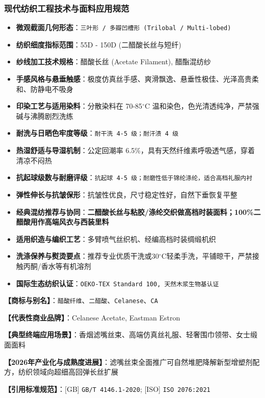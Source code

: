 \documentclass[11pt,openright,twoside,UTF8]{ctexbook}
\begin{document}
\subsubsection*{现代纺织工程技术与面料应用规范}
\begin{itemize} \setlength{\itemsep}{2pt}
    \item \textbf{微观截面几何形态}：\texttt{三叶形 / 多瓣凹槽形 (Trilobal / Multi-lobed)}
    \item \textbf{纺织细度指标范围}：55D - 150D (二醋酸长丝与短纤)
    \item \textbf{纱线加工技术规格}：醋酸长丝 (Acetate Filament), 醋酯混纺纱
    \item \textbf{手感风格与悬垂触感}：极度仿真丝手感、爽滑飘逸、悬垂性极佳、光泽高贵柔和、防静电不吸身
    \item \textbf{印染工艺与适用染料}：分散染料在 70-85$^\circ\mathrm{C}$ 温和染色，色光清透纯净，严禁强碱与沸腾剧烈洗练
    \item \textbf{耐洗与日晒色牢度等级}：\texttt{耐干洗 4-5 级；耐汗渍 4 级}
    \item \textbf{热湿舒适与导湿机制}：公定回潮率 6.5\%，具有天然纤维素呼吸透气感，穿着清凉不闷热
    \item \textbf{抗起球级数与耐磨评级}：\texttt{抗起球 4-5 级；耐磨性低于锦纶涤纶，适合高档礼服内衬}
    \item \textbf{弹性伸长与抗皱保形}：抗皱性优良，尺寸稳定性好，自然下垂恢复平整
    \item \textbf{经典混纺推荐与协同}：\textbf{二醋酸长丝与粘胶/涤纶交织做高档时装面料；100\%二醋酸用作高端风衣与西装里料}
    \item \textbf{适用织造与编织工艺}：多臂喷气丝织机、经编高档时装绸缎机织
    \item \textbf{洗涤保养与熨烫要点}：推荐专业优质干洗或30$^\circ\mathrm{C}$轻柔手洗，平铺晾干，严禁接触丙酮/香水等有机溶剂
    \item \textbf{国际生态纺织认证}：\texttt{OEKO-TEX Standard 100, 天然木浆生物基认证}
\end{itemize}
\vspace{0.2cm}

\noindent\textbf{【商标与别名】}：\texttt{醋酸纤维}、\texttt{二醋酸}、\texttt{Celanese}、\texttt{CA}\par
\noindent\textbf{【代表性商业品牌】}：Celanese Acetate, Eastman Estron\par
\noindent\textbf{【典型终端应用场景】}：香烟滤嘴丝束、高端仿真丝礼服、轻奢围巾领带、女士缎面面料\par
\noindent\textbf{【2026年产业化与成熟度进展】}：滤嘴丝束全面推广可自然堆肥降解新型增塑剂配方，纺织领域向超细高回弹长丝扩展\par
\noindent\textbf{【引用标准规范】}：[GB] \texttt{GB/T 4146.1-2020}; [ISO] \texttt{ISO 2076:2021}\par
\vspace{0.5cm}
\end{document}

